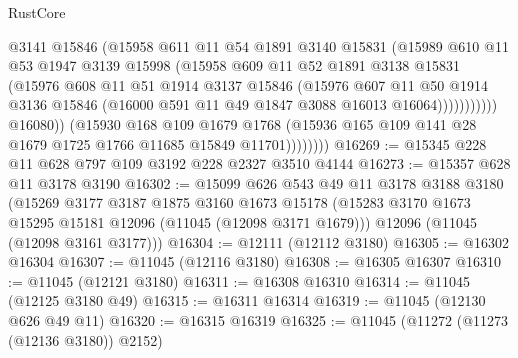 \begin{lexlean}{RustCore}
\begin{coremodule}
                              @3141
                              @15846
                              (@15958
                                @611
                                @11
                                @54
                                @1891
                                @3140
                                @15831
                                (@15989
                                  @610
                                  @11
                                  @53
                                  @1947
                                  @3139
                                  @15998
                                  (@15958
                                    @609
                                    @11
                                    @52
                                    @1891
                                    @3138
                                    @15831
                                    (@15976
                                      @608
                                      @11
                                      @51
                                      @1914
                                      @3137
                                      @15846
                                      (@15976
                                        @607
                                        @11
                                        @50
                                        @1914
                                        @3136
                                        @15846
                                        (@16000 @591 @11 @49 @1847 @3088 @16013 @16064)))))))))))
                    @16080))
                (@15930
                  @168
                  @109
                  @1679
                  @1768
                  (@15936 @165 @109 @141 @28 @1679 @1725 @1766 @11685 @15849 @11701))))))))
@16269 := @15345 @228 @11 @628 @797 @109 @3192 @228 @2327 @3510 @4144
@16273 := @15357 @628 @11 @3178 @3190
@16302 := @15099
    @626
    @543
    @49
    @11
    @3178
    @3188
    @3180
    (@15269
      @3177
      @3187
      @1875
      @3160
      @1673
      @15178
      (@15283 @3170 @1673 @15295 @15181 @12096 (@11045 (@12098 @3171 @1679)))
      @12096
      (@11045 (@12098 @3161 @3177)))
@16304 := @12111 (@12112 @3180)
@16305 := @16302 @16304
@16307 := @11045 (@12116 @3180)
@16308 := @16305 @16307
@16310 := @11045 (@12121 @3180)
@16311 := @16308 @16310
@16314 := @11045 (@12125 @3180 @49)
@16315 := @16311 @16314
@16319 := @11045 (@12130 @626 @49 @11)
@16320 := @16315 @16319
@16325 := @11045 (@11272 (@11273 (@12136 @3180)) @2152)

\end{coremodule}
\end{lexlean}
